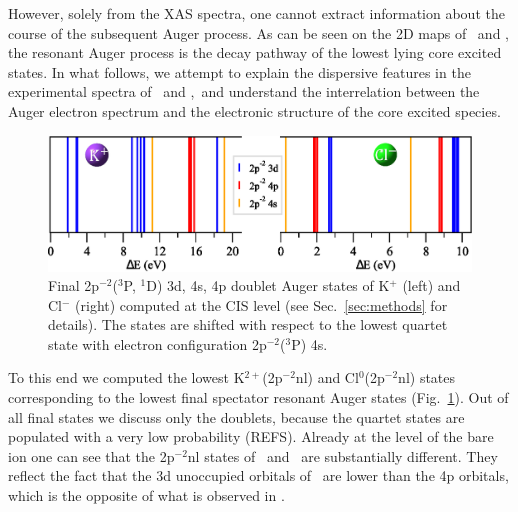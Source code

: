However, solely from the XAS spectra, one cannot extract information about the course of the subsequent Auger process. As can be seen on the 2D maps of \ki~and \cli, the resonant Auger process is the decay pathway of the lowest lying core excited states. In what follows, we attempt to explain the dispersive features in the experimental spectra of \ki~and \cli,~and understand the interrelation between the Auger electron spectrum and the electronic structure of the core excited species. 


\begin{figure}[h!]
\centering
\includegraphics[scale=0.6]{figures/fg3_kcl_2p-2nl.eps}
\caption{Final 2p$^{-2}$($^3$P, $^1$D) 3d, 4s, 4p doublet Auger states of K$^{+}$ (left) and Cl$^{-}$ (right) computed at the CIS level (see Sec.\ \ref{sec:methods} for details). The states are shifted with respect to the lowest quartet state with electron configuration 2p$^{-2}$($^3$P) 4s.}
\label{fg:kcl_2p4nl}
\end{figure}


To this end we computed the lowest K$^{2+}$(2p$^{-2}$nl) and Cl$^{0}$(2p$^{-2}$nl) states corresponding to the lowest final spectator resonant Auger states (Fig.\ \ref{fg:kcl_2p4nl}). Out of all final states we discuss only the doublets, because the quartet states are populated with a very low probability (REFS). Already at the level of the bare ion one can see that the 2p$^{-2}$nl states of \ki~and \cli~are substantially different. They reflect the fact that the 3d unoccupied orbitals of \ki~are lower than the 4p orbitals, which is the opposite of what is observed in \cli. 


